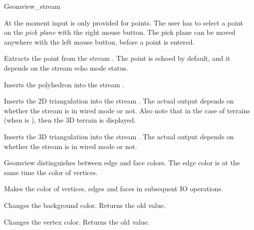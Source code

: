 \begin{ccRefClass}{Geomview_stream}

At the moment input is only provided for points. The user has to select
a point on the {\it pick plane} with the right mouse button. The pick plane
can be moved anywhere with the left mouse button, before a point is entered.

{Extracts the point  from the stream \ccVar. The point is
 echoed by default, and it depends on the stream echo mode status.}





{Inserts the polyhedron  into the stream \ccVar.}


{Inserts the 2D triangulation  into the stream \ccVar.
 The actual output depends on whether the stream is in wired mode or not.
 Also note that in the case of terrains (when  is
 ), then the 3D terrain is displayed.}


{Inserts the 3D triangulation  into the stream \ccVar.
 The actual output depends on whether the stream is in wired mode or not.}


Geomview distinguishes between edge and face colors. The edge color
is at the same time the color of vertices. 

{Makes  the color of vertices, edges and faces in subsequent IO 
 operations.}

{Changes the background color. Returns the old value.}

{Changes the vertex color. Returns the old value.}


\end{ccRefClass}
